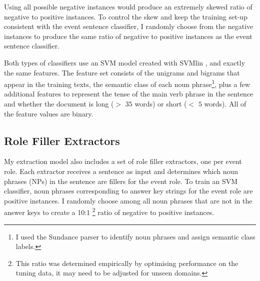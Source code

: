 Using all possible negative instances would produce an extremely skewed ratio of
negative to positive instances. To control the skew and keep
the training set-up consistent with the event sentence
classifier, I randomly choose from the negative
instances to produce 
the same ratio of negative to positive instances as the event sentence classifier.


Both types of classifiers use an SVM model created with
SVMlin \cite{keerthi05}, and exactly the same features. The feature set
consists of the unigrams and bigrams that appear in the training
texts, the semantic class of each noun phrase\footnote{I used the
Sundance parser \cite{riloff-sundance04} to identify noun phrases and assign
semantic class labels.}, plus a few additional features to represent
the tense of the main verb phrase in the sentence and  whether the document is long ($>$ $35$ words) or short ($<$ $5$ words). All of the feature values are binary.

\subsection{Role Filler Extractors}
\label{sssec:role-filler-extractors}


My extraction model also includes a set of role filler extractors,
one per event role.  Each extractor receives a sentence as input and
determines which noun phrases (NPs) in the sentence are fillers for
the event role. To train an SVM classifier, noun phrases corresponding
to answer key strings for the event role are positive instances. 
I
randomly choose among all noun phrases that are not in the answer keys
to create a 10:1 \footnote{This ratio was determined empirically 
by optimising performance on the tuning data, 
it may need to be adjusted for unseen domains.} ratio of negative to positive instances.

